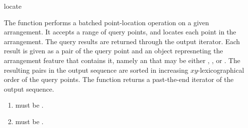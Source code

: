\ccRefPageBegin

\begin{ccRefFunction}{locate}

\ccDefinition

The function \ccRefName{} performs a batched point-location operation on a
given arrangement. It accepts a range of query points, and locates each
point in the arrangement. The query results are returned through the output
iterator. Each result is given as a pair of the query point and an object
represneting the arrangement feature that contains it, namely an
 that may be either ,
, or . The resulting
pairs in the output sequence are sorted in increasing $xy$-lexicographical
order of the query points. The function returns a past-the-end iterator of
the output sequence.



\ccRequirements
\begin{enumerate}
\item {} must be .
\item {} must be
  .
\end{enumerate}

\end{ccRefFunction}

\ccRefPageEnd
